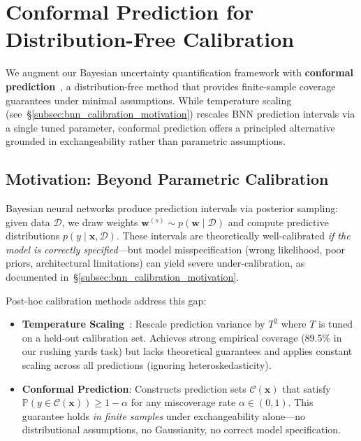 \section{Conformal Prediction for Distribution-Free Calibration}
\label{sec:conformal-calibration}

We augment our Bayesian uncertainty quantification framework with \textbf{conformal prediction}~\citep{vovk2005algorithmic, shafer2008tutorial}, a distribution-free method that provides finite-sample coverage guarantees under minimal assumptions. While temperature scaling (see~\S\ref{subsec:bnn_calibration_motivation}) rescales BNN prediction intervals via a single tuned parameter, conformal prediction offers a principled alternative grounded in exchangeability rather than parametric assumptions.

\subsection{Motivation: Beyond Parametric Calibration}\label{subsec:conformal-motivation}

Bayesian neural networks produce prediction intervals via posterior sampling: given data $\mathcal{D}$, we draw weights $\mathbf{w}^{(s)} \sim p(\mathbf{w} \mid \mathcal{D})$ and compute predictive distributions $p(y \mid \mathbf{x}, \mathcal{D})$. These intervals are theoretically well-calibrated \textit{if the model is correctly specified}—but model misspecification (wrong likelihood, poor priors, architectural limitations) can yield severe under-calibration, as documented in~\S\ref{subsec:bnn_calibration_motivation}.

Post-hoc calibration methods address this gap:

\begin{itemize}
    \item \textbf{Temperature Scaling}~\citep{guo2017calibration}: Rescale prediction variance by $T^2$ where $T$ is tuned on a held-out calibration set. Achieves strong empirical coverage (89.5\% in our rushing yards task) but lacks theoretical guarantees and applies constant scaling across all predictions (ignoring heteroskedasticity).

    \item \textbf{Conformal Prediction}: Constructs prediction sets $\mathcal{C}(\mathbf{x})$ that satisfy $\mathbb{P}(y \in \mathcal{C}(\mathbf{x})) \geq 1 - \alpha$ for any miscoverage rate $\alpha \in (0,1)$. This guarantee holds \textit{in finite samples} under exchangeability alone—no distributional assumptions, no Gaussianity, no correct model specification.
\end{itemize}


